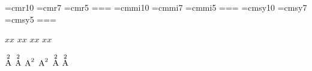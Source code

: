 %
%
%
%

\font\rm=cmr10 \font\rs=cmr7 \font\rss=cmr5
=\rm {}=\rs {}=\rss
\font\mi=cmmi10 \font\mis=cmmi7 \font\miss=cmmi5
=\mi {}=\mis {}=\miss
\font\sy=cmsy10 \font\sys=cmsy7 \font\syss=cmsy5
=\sy {}=\sys {}=\syss
\rm
\let\ds=\displaystyle \let\ts=\textstyle
\let\ss=\scriptstyle  \let\sss=\scriptscriptstyle
\let\li=\limits \let\nl=\nolimits \let\dl=\displaylimits
\let\ml=\moveleft \let\mr=\moveright \let\ra=\raise \let\lo=\lower

\hbox{$\displaystyle x$}\hbox{$\ds x$}
\hbox{$\textstyle x$}\hbox{$\ts x$}
\hbox{$\scriptstyle x$}\hbox{$\ss x$}
\hbox{$\scriptscriptstyle x$}\hbox{$\sss x$}

\hbox{$\displaystyle\mathop{\rm A}\limits^2$}
\hbox{$\displaystyle\mathop{\rm A}\li^2$}
\hbox{$\displaystyle\mathop{\rm A}\nolimits^2$}
\hbox{$\displaystyle\mathop{\rm A}\nl^2$}
\hbox{$\displaystyle\mathop{\rm A}\displaylimits^2$}
\hbox{$\displaystyle\mathop{\rm A}\dl^2$}

